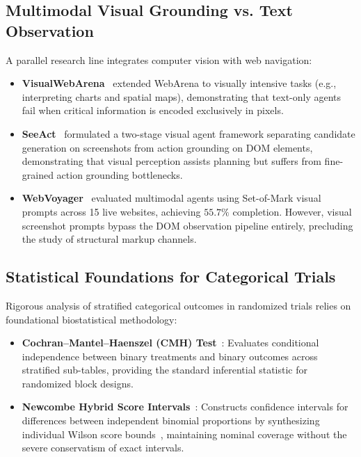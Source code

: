\documentclass[11pt,a4paper]{article}
\begin{document}
\subsection{Multimodal Visual Grounding vs. Text Observation}
A parallel research line integrates computer vision with web navigation:
\begin{itemize}
    \item \textbf{VisualWebArena}~\cite{koh2024visualwebarena} extended WebArena to visually intensive tasks (e.g., interpreting charts and spatial maps), demonstrating that text-only agents fail when critical information is encoded exclusively in pixels.
    \item \textbf{SeeAct}~\cite{zheng2024seeact} formulated a two-stage visual agent framework separating candidate generation on screenshots from action grounding on DOM elements, demonstrating that visual perception assists planning but suffers from fine-grained action grounding bottlenecks.
    \item \textbf{WebVoyager}~\cite{he2024webvoyager} evaluated multimodal agents using Set-of-Mark visual prompts across 15 live websites, achieving $55.7\%$ completion. However, visual screenshot prompts bypass the DOM observation pipeline entirely, precluding the study of structural markup channels.
\end{itemize}

\subsection{Statistical Foundations for Categorical Trials}
Rigorous analysis of stratified categorical outcomes in randomized trials relies on foundational biostatistical methodology:
\begin{itemize}
    \item \textbf{Cochran--Mantel--Haenszel (CMH) Test}~\cite{mantel1959statistical, agresti2002categorical}: Evaluates conditional independence between binary treatments and binary outcomes across stratified sub-tables, providing the standard inferential statistic for randomized block designs.
    \item \textbf{Newcombe Hybrid Score Intervals}~\cite{newcombe1998interval}: Constructs confidence intervals for differences between independent binomial proportions by synthesizing individual Wilson score bounds~\cite{wilson1927probable}, maintaining nominal coverage without the severe conservatism of exact intervals.
\end{itemize}
\end{document}
